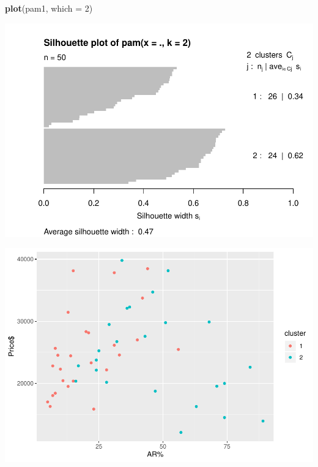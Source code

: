 \documentclass[]{article}
\newenvironment{Shaded}{\begin{snugshade}}{\end{snugshade}}
\newcommand{\KeywordTok}[1]{\textcolor[rgb]{0.13,0.29,0.53}{\textbf{#1}}}
\newcommand{\DataTypeTok}[1]{\textcolor[rgb]{0.13,0.29,0.53}{#1}}
\newcommand{\DecValTok}[1]{\textcolor[rgb]{0.00,0.00,0.81}{#1}}
\newcommand{\StringTok}[1]{\textcolor[rgb]{0.31,0.60,0.02}{#1}}
\newcommand{\OperatorTok}[1]{\textcolor[rgb]{0.81,0.36,0.00}{\textbf{#1}}}
\newcommand{\NormalTok}[1]{#1}
\begin{document}
\begin{Shaded}
\begin{Highlighting}[]
\KeywordTok{plot}\NormalTok{(pam1, }\DataTypeTok{which =} \DecValTok{2}\NormalTok{)}
\end{Highlighting}
\end{Shaded}

\begin{center}\includegraphics{project1_files/figure-latex/unnamed-chunk-5-9} \end{center}

\begin{Shaded}
\end{Shaded}

\begin{center}\includegraphics{project1_files/figure-latex/unnamed-chunk-5-10} \end{center}
\end{document}
